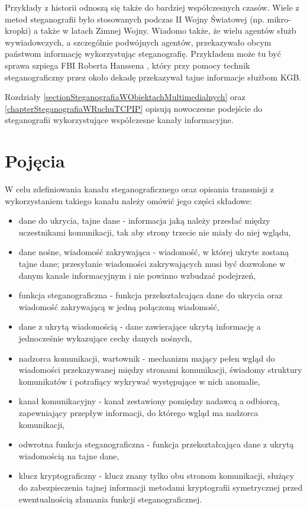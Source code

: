 \documentclass[a4paper,12pt,twoside,openany]{report}
\begin{document}
Przykłady z historii odnoszą się także do bardziej współczesnych czasów. Wiele z metod steganografii było stosowanych podczas II Wojny Światowej (np. mikro-kropki) a także w latach Zimnej Wojny. Wiadomo także, że wielu agentów służb wywiadowczych, a szczególnie podwójnych agentów, przekazywało obcym państwom informację wykorzystując steganografię. Przykładem może tu być sprawa szpiega FBI Roberta Hanssena \cite{Hanssen}, który przy pomocy technik steganograficzny przez około dekadę przekazywał tajne informacje służbom KGB.

Rozdziały \ref{sectionSteganografiaWObiektachMultimedialnych} oraz \ref{chapterSteganografiaWRuchuTCPIP} opisują nowoczesne podejście do steganografii wykorzystujące współczesne kanały informacyjne. 
\section{Pojęcia}
W celu zdefiniowania kanału steganograficznego oraz opisania transmisji z wykorzystaniem takiego kanału należy omówić jego części składowe:
\begin{itemize}
	\item dane do ukrycia, tajne dane - informacja jaką należy przesłać między uczestnikami komunikacji, tak aby strony trzecie nie miały do niej wglądu,
	\item dane nośne, wiadomość zakrywająca - wiadomość, w której ukryte zostaną tajne dane; przesyłanie wiadomości zakrywających musi być dozwolone w danym kanale informacyjnym i nie powinno wzbudzać podejrzeń,
	\item funkcja steganograficzna - funkcja przekształcająca dane do ukrycia oraz wiadomość zakrywającą w jedną połączoną wiadomość,
	\item dane z ukrytą wiadomością - dane zawierające ukrytą informację a jednocześnie wykazujące cechy danych nośnych,
	\item nadzorca komunikacji, wartownik - mechanizm mający pełen wgląd do wiadomości przekazywanej między stronami komunikacji, świadomy struktury komunikatów i potrafiący wykrywać występujące w nich anomalie,
	\item kanał komunikacyjny - kanał zestawiony pomiędzy nadawcą a odbiorcą, zapewniający przepływ informacji, do którego wgląd ma nadzorca komunikacji,
	\item odwrotna funkcja steganograficzna - funkcja przekształcająca dane z ukrytą wiadomością na tajne dane,
	\item klucz kryptograficzny - klucz znany tylko obu stronom komunikacji, służący do zabezpieczenia tajnej informacji metodami kryptografii symetrycznej przed ewentualnością złamania funkcji steganograficznej.
\end{itemize}
\end{document}
